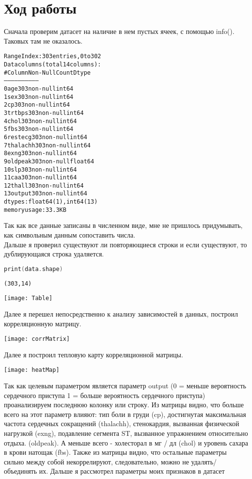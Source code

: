 \pagebreak

\section{Ход работы}

Сначала проверим датасет на наличие в нем пустых ячеек, с помощью info().
Таковых там не оказалось.

\begin{alltt}
RangeIndex: 303 entries, 0 to 302
Data columns (total 14 columns):
 \#   Column    Non-Null Count  Dtype  
---  	------    	--------------  		-----  
 0   age       	303 non-null    	int64  
 1   sex       	303 non-null    	int64  
 2   cp        	303 non-null    	int64  
 3   trtbps    	303 non-null    	int64  
 4   chol      	303 non-null    	int64  
 5   fbs       	303 non-null    	int64  
 6   restecg   	303 non-null    	int64  
 7   thalachh   303 non-null    	int64  
 8   exng      	303 non-null    	int64  
 9   oldpeak    303 non-null    	float64
 10  slp       	303 non-null    	int64  
 11  caa       	303 non-null    	int64  
 12  thall     	303 non-null    	int64  
 13  output     303 non-null    	int64  
dtypes: float64(1), int64(13)
memory usage: 33.3 KB
\end{alltt}

Так как все данные записаны в численном виде, мне не пришлось придумывать, как символьным данным сопоставить числа.\\
Дальше я проверил существуют ли повторяющиеся строки и если существуют, то дублирующаяся строка удаляется.

\begin{lstlisting}[language=C]
print(data.shape)
\end{lstlisting}

\begin{alltt}
(303, 14)
\end{alltt}

\texttt{[image: Table]}

Далее я перешел непосредственно к анализу зависимостей в данных, построил корреляционную матрицу.

\texttt{[image: corrMatrix]}

Далее я построил тепловую карту корреляционной матрицы.

\texttt{[image: heatMap]} 

Так как целевым параметром является параметр output (0 = меньше вероятность сердечного приступа 1 = больше вероятность сердечного приступа) проанализируем последнюю колонку или строку.  Из матрицы видно, что больше всего на этот параметр влияют: тип боли в груди (cp), достигнутая максимальная частота сердечных сокращений (thalachh), стенокардия, вызванная физической нагрузкой  (exng), подавление сегмента ST, вызванное упражнением относительно отдыха. (oldpeak).
А меньше
всего - холесторал в мг / дл (chol) и уровень сахара в крови натощак (fbs). Также из матрицы видно, что
остальные параметры сильно между собой некоррелируют, следовательно, можно не
удалять/объединять их.
Дальше я рассмотрел параметры моих признаков в датасет

